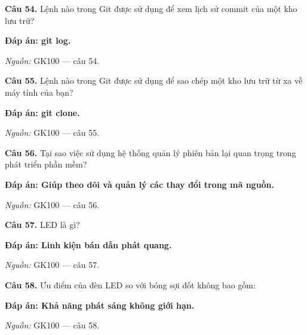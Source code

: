 \documentclass[11pt,a4paper]{article}
\begin{document}
\textbf{Câu 54.} Lệnh nào trong Git được sử dụng để xem lịch sử commit của một kho lưu trữ?\par
{\color{answer}\textbf{Đáp án: git log.}}\par
{\footnotesize\color{sourcegray}\textit{Nguồn:} GK100 — câu 54.\par}
\vspace{3pt}\par\noindent{\color{black!18}\rule{\linewidth}{0.3pt}}\par\medskip

\textbf{Câu 55.} Lệnh nào trong Git được sử dụng để sao chép một kho lưu trữ từ xa về máy tính của bạn?\par
{\color{answer}\textbf{Đáp án: git clone.}}\par
{\footnotesize\color{sourcegray}\textit{Nguồn:} GK100 — câu 55.\par}
\vspace{3pt}\par\noindent{\color{black!18}\rule{\linewidth}{0.3pt}}\par\medskip

\textbf{Câu 56.} Tại sao việc sử dụng hệ thống quản lý phiên bản lại quan trọng trong phát triển phần mềm?\par
{\color{answer}\textbf{Đáp án: Giúp theo dõi và quản lý các thay đổi trong mã nguồn.}}\par
{\footnotesize\color{sourcegray}\textit{Nguồn:} GK100 — câu 56.\par}
\vspace{3pt}\par\noindent{\color{black!18}\rule{\linewidth}{0.3pt}}\par\medskip

\textbf{Câu 57.} LED là gì?\par
{\color{answer}\textbf{Đáp án: Linh kiện bán dẫn phát quang.}}\par
{\footnotesize\color{sourcegray}\textit{Nguồn:} GK100 — câu 57.\par}
\vspace{3pt}\par\noindent{\color{black!18}\rule{\linewidth}{0.3pt}}\par\medskip

\textbf{Câu 58.} Ưu điểm của đèn LED so với bóng sợi đốt không bao gồm:\par
{\color{answer}\textbf{Đáp án: Khả năng phát sáng không giới hạn.}}\par
{\footnotesize\color{sourcegray}\textit{Nguồn:} GK100 — câu 58.\par}
\vspace{3pt}\par\noindent{\color{black!18}\rule{\linewidth}{0.3pt}}\par\medskip
\end{document}
